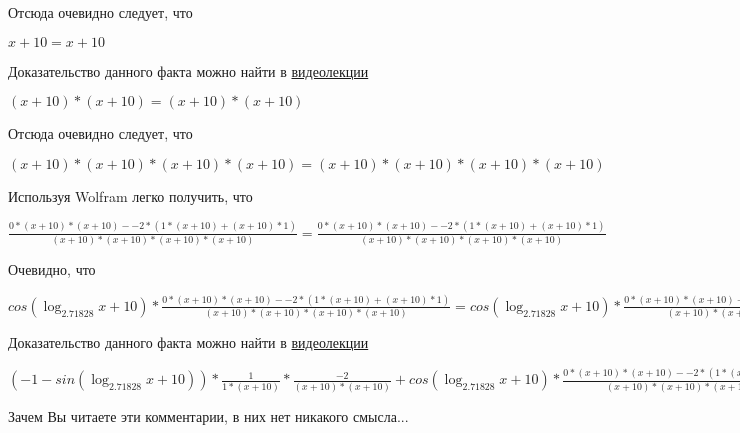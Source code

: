 \documentclass[12pt,a4paper,fleqn]{article}
\theoremstyle{definition}
\begin{document}
Отсюда очевидно следует, что

$ x  +  10  =  x  +  10 $

Доказательство данного факта можно найти в \href{https://www.youtube.com/watch?v=dQw4w9WgXcQ}{видеолекции}

$( x  +  10 ) * ( x  +  10 ) = ( x  +  10 ) * ( x  +  10 )$

Отсюда очевидно следует, что

$( x  +  10 ) * ( x  +  10 ) * ( x  +  10 ) * ( x  +  10 ) = ( x  +  10 ) * ( x  +  10 ) * ( x  +  10 ) * ( x  +  10 )$

Используя Wolfram легко получить, что

$\frac{ 0  * ( x  +  10 ) * ( x  +  10 ) -  -2  * ( 1  * ( x  +  10 ) + ( x  +  10 ) *  1 )}{( x  +  10 ) * ( x  +  10 ) * ( x  +  10 ) * ( x  +  10 )}
 = \frac{ 0  * ( x  +  10 ) * ( x  +  10 ) -  -2  * ( 1  * ( x  +  10 ) + ( x  +  10 ) *  1 )}{( x  +  10 ) * ( x  +  10 ) * ( x  +  10 ) * ( x  +  10 )}
$

Очевидно, что

$cos(\log_{ 2.71828 }{ x  +  10 }) * \frac{ 0  * ( x  +  10 ) * ( x  +  10 ) -  -2  * ( 1  * ( x  +  10 ) + ( x  +  10 ) *  1 )}{( x  +  10 ) * ( x  +  10 ) * ( x  +  10 ) * ( x  +  10 )}
 = cos(\log_{ 2.71828 }{ x  +  10 }) * \frac{ 0  * ( x  +  10 ) * ( x  +  10 ) -  -2  * ( 1  * ( x  +  10 ) + ( x  +  10 ) *  1 )}{( x  +  10 ) * ( x  +  10 ) * ( x  +  10 ) * ( x  +  10 )}
$

Доказательство данного факта можно найти в \href{https://www.youtube.com/watch?v=dQw4w9WgXcQ}{видеолекции}

$( -1  - sin(\log_{ 2.71828 }{ x  +  10 })) * \frac{ 1 }{ 1  * ( x  +  10 )}
 * \frac{ -2 }{( x  +  10 ) * ( x  +  10 )}
 + cos(\log_{ 2.71828 }{ x  +  10 }) * \frac{ 0  * ( x  +  10 ) * ( x  +  10 ) -  -2  * ( 1  * ( x  +  10 ) + ( x  +  10 ) *  1 )}{( x  +  10 ) * ( x  +  10 ) * ( x  +  10 ) * ( x  +  10 )}
 = ( -1  - sin(\log_{ 2.71828 }{ x  +  10 })) * \frac{ 1 }{ 1  * ( x  +  10 )}
 * \frac{ -2 }{( x  +  10 ) * ( x  +  10 )}
 + cos(\log_{ 2.71828 }{ x  +  10 }) * \frac{ 0  * ( x  +  10 ) * ( x  +  10 ) -  -2  * ( 1  * ( x  +  10 ) + ( x  +  10 ) *  1 )}{( x  +  10 ) * ( x  +  10 ) * ( x  +  10 ) * ( x  +  10 )}
$

Зачем Вы читаете эти комментарии, в них нет никакого смысла...
\end{document}
